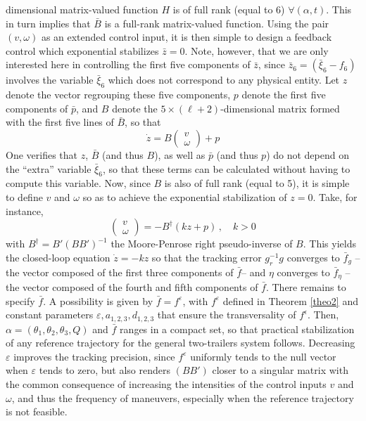 \documentclass[a4paper,twoside]{article}
\def \eps {\varepsilon}
\begin{document}
dimensional matrix-valued function $H$ is of full rank (equal to 6) $\forall (\alpha,t)$. This in turn implies 
that $\bar{B}$ is a full-rank matrix-valued function. Using the pair $(v,\omega)$ as an extended control input, it is 
then simple to design a feedback control which exponential stabilizes $\bar{z}=0$. Note, however, that we are only 
interested here in controlling the first five components of $\bar{z}$, since $\bar{z}_6=(\bar{\xi}_6-f_6)$ involves the variable $\bar{\xi}_6$ which does not correspond to any physical entity. 
Let $z$ denote the vector regrouping these five components, $p$ denote the first five components of $\bar{p}$, 
and $B$ denote the $5 \times (\ell+2)$-dimensional matrix formed with the first five lines of $\bar{B}$, so that
\begin{equation}
\label{sysz}
\dot{z}=B \begin{pmatrix} v \\ \omega \end{pmatrix} + p
\end{equation}
One verifies that $z$, $\bar{B}$ (and thus $B$), as well as $\bar{p}$ (and thus $p$) do not depend on the 
``extra'' variable $\bar{\xi}_6$, so that these terms can be calculated without having to compute this variable.   
Now, since $B$ is also of full rank (equal to 5), it is simple to define $v$ and $\omega$ so as to achieve
the exponential stabilization of $z=0$. Take, for instance,
\begin{equation} \label{control}
\begin{pmatrix} v \\ \omega \end{pmatrix}= -B^{\dagger} (k z +p) \, , \quad k>0
\end{equation}
with $B^{\dagger}= B'(B B')^{-1}$ the Moore-Penrose right pseudo-inverse of $B$. 
This yields the closed-loop equation $\dot z = -k z$ so that 
the tracking error $g_r^{-1} g$ converges  to $\bar f_g$ --the vector composed of the 
first three components of $\bar f$-- and $\eta$ converges to $\bar f_{\eta}$ --the 
vector composed of the fourth and fifth components of $\bar f$. There remains to specify $\bar f$. 
A possibility is given by $\bar f= f^\eps$, with $f^\eps$ defined in
Theorem \ref{theo2} and constant parameters $\eps, a_{1,2,3}, d_{1,2,3}$ that ensure the 
transversality of $f^{\epsilon}$. Then, $\alpha=(\theta_1,\theta_2,\theta_3,Q)$ and $\bar f$ ranges in a compact 
set, so that practical
stabilization of any reference trajectory for the general two-trailers system follows. Decreasing $\eps$ improves
the tracking precision, since $f^\eps$ uniformly tends to the null vector when $\eps$ tends to zero, but also renders $(B B')$ closer to a singular matrix with the common consequence of increasing the intensities of the control inputs $v$ and $\omega$, and thus the frequency of maneuvers, especially when the reference trajectory is not feasible.
\end{document}
